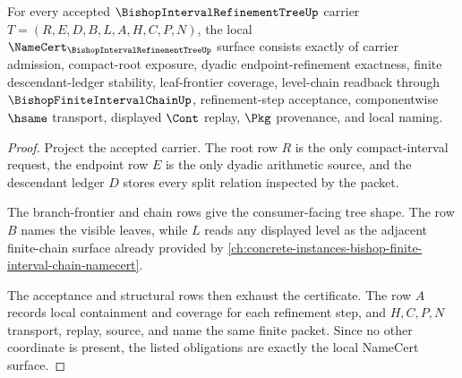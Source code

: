 \begin{theorem}
\label{thm:bishop-interval-refinement-tree-namecert-obligations}
For every accepted $\BishopIntervalRefinementTreeUp$ carrier $T=(R,E,D,B,L,A,H,C,P,N)$, the local $\NameCert_{\BishopIntervalRefinementTreeUp}$ surface consists exactly of carrier admission, compact-root exposure, dyadic endpoint-refinement exactness, finite descendant-ledger stability, leaf-frontier coverage, level-chain readback through $\BishopFiniteIntervalChainUp$, refinement-step acceptance, componentwise $\hsame$ transport, displayed $\Cont$ replay, $\Pkg$ provenance, and local naming.
\end{theorem}
\begin{proof}
Project the accepted carrier. The root row $R$ is the only compact-interval request, the endpoint row $E$ is the only dyadic arithmetic source, and the descendant ledger $D$ stores every split relation inspected by the packet.

The branch-frontier and chain rows give the consumer-facing tree shape. The row $B$ names the visible leaves, while $L$ reads any displayed level as the adjacent finite-chain surface already provided by \autoref{ch:concrete-instances-bishop-finite-interval-chain-namecert}.

The acceptance and structural rows then exhaust the certificate. The row $A$ records local containment and coverage for each refinement step, and $H,C,P,N$ transport, replay, source, and name the same finite packet. Since no other coordinate is present, the listed obligations are exactly the local NameCert surface.
\end{proof}

